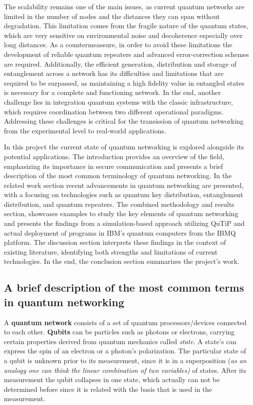 \documentclass[12pt]{ieeetj}
\begin{document}
		The scalability remains one of the main issues,
		as current quantum networks are limited in the number of nodes and the
		distances they can span without degradation.
		This limitation comes from the fragile nature of the quantum states,
		which are very sensitive on environmental noise and decoherence especially over long distances.
		As a countermeassure, in order to avoid these limitations the development of reliable quantum repeaters
		and advanced error-correction schemes are required.	
		Additionally, the efficient generation, distribution and storage of entanglement 
		across a network has its difficulties and limitations that are required to be surpassed, 
		as maintaining a high fidelity value in entangled
		states is necessary for a complete and functioning network.
		In the end, another challenge lies in integration
	        quantum systems with the classic infrastructure,
	        which requires coordination between
	        two different operational paradigms.
	        Addressing these challenges is critical for the transission of 
		quantum networking from the experimental level to real-world applications.

		In this project the current state of quantum networking is explored alongside its potential applications. 
		The introduction provides an overview of the field, emphasizing its importance in secure communication and presents a brief
		description of the most common terminology of quantum networking.	
		In the related work section recent advancements in quantum networking are presented, with a focusing on technologies such as 
		quantum key distribution, entanglement distribution, and quantum repeaters. 
		The combined methodology and results section, showcases examples to study the key elements of quantum networking and presents the findings
		from a simulation-based approach utilizing QuTiP and actual deployment of programs in IBM's quantum computers from the IBMQ platform.
		The discussion section interprets these findings in the context of existing literature, 
		identifying both strengths and limitations of current technologies. 
		In the end, the conclusion section summarizes the project's work.


		\subsection{A brief description of the most common terms in quantum networking}

		A \textbf{quantum network} consists of a set of quantum processors/devices connected to each other. \textbf{Qubits} can be particles such as photons
		or electrons, carrying certain properties derived from quantum mechanics called \textit{state}. A state's can express the spin of an electron or
		a photon's polarization. The particular state of a qubit is unknown prior to its measurement, since it is in a 
		superposition (\textit{as an analogy one can think the linear combination of two variables)} of states.
		After its measurement the qubit collapses in one state, which actually can not be determined
		before since it is related with the basis that is used in the measurement.
		
\end{document}
